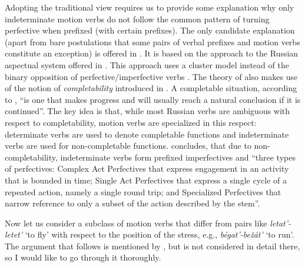 Adopting the traditional view requires us to provide some explanation why only indeterminate motion verbs do not follow the common pattern of turning perfective when prefixed (with certain prefixes). The only candidate explanation (apart from bare postulations that some pairs of verbal prefixes and motion verbs constitute an exception) is offered in \citealt{Janda:10}. It is based on the approach to the Russian aspectual system offered in \citealt{Janda:07a}. This approach uses a cluster model   instead of the binary opposition of perfective/imperfective verbs . The theory of \citet{Janda:10} also makes use of the notion of \textit{completability} introduced in \citealt{Janda:07a}. A completable situation, according to \citet[129]{Janda:10}, ``is one that makes progress and will usually reach a natural conclusion if it is continued''. The key idea is that, while most Russian verbs are ambiguous with respect to completability, motion verbs are specialized in this respect: determinate verbs  are used to denote completable functions and indeterminate verbs  are used for non-completable functions. \citet[138]{Janda:10} concludes, that due to non-completability, indeterminate verbs  form prefixed imperfectives and ``three types of perfectives: Complex Act Perfectives that express engagement in an activity that is bounded in time; Single Act Perfectives that express a single cycle of a repeated action, namely a single round trip; and Specialized Perfectives that narrow reference to only a subset of the action described by the stem''.

Now let us consider a subclass of motion verbs that differ from pairs like \textit{letat'\textsubscript{\INDET}-letet'\textsubscript{\DET}} `to fly' with respect to the position of the stress, e.g., \textit{b\'{e}gat'\textsubscript{\INDET}-be\v{z}\'{a}t'\textsubscript{\DET}} `to run'. The argument that follows is mentioned by \citet{Isachenko:60}, but is not considered in detail there, so I would like to go through it thoroughly. 

